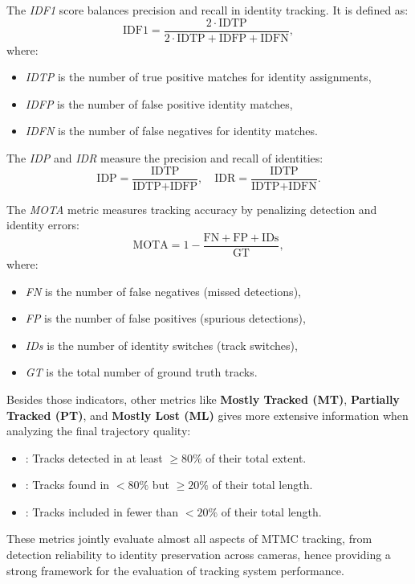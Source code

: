 The \textit{IDF1} score balances precision and recall in identity tracking. It is defined as:
\[
\text{IDF1} = \frac{2 \cdot \text{IDTP}}{2 \cdot \text{IDTP} + \text{IDFP} + \text{IDFN}},
\]
where:
\begin{itemize}
    \item \textit{IDTP} is the number of true positive matches for identity assignments,
    \item \textit{IDFP} is the number of false positive identity matches,
    \item \textit{IDFN} is the number of false negatives for identity matches.
\end{itemize}

The \textit{IDP} and \textit{IDR} measure the precision and recall of identities:
\[
\text{IDP} = \frac{\text{IDTP}}{\text{IDTP} + \text{IDFP}}, \quad
\text{IDR} = \frac{\text{IDTP}}{\text{IDTP} + \text{IDFN}}.
\]

The \textit{MOTA} metric measures tracking accuracy by penalizing detection and identity errors:
\[
\text{MOTA} = 1 - \frac{\text{FN} + \text{FP} + \text{IDs}}{\text{GT}},
\]
where:
\begin{itemize}
    \item \textit{FN} is the number of false negatives (missed detections),
    \item \textit{FP} is the number of false positives (spurious detections),
    \item \textit{IDs} is the number of identity switches (track switches),
    \item \textit{GT} is the total number of ground truth tracks.
\end{itemize}

Besides those indicators, other metrics like \textbf{Mostly Tracked (MT)}, \textbf{Partially Tracked (PT)}, and \textbf{Mostly Lost (ML)} gives more extensive information when analyzing the final trajectory quality:
\begin{itemize}
    \item {}: Tracks detected in at least $\geq 80\%$ of their total extent.
    \item {}: Tracks found in $< 80\%$ but $\geq 20\%$ of their total length.
    \item {}: Tracks included in fewer than $< 20\%$ of their total length.
\end{itemize}

These metrics jointly evaluate almost all aspects of MTMC tracking, from detection reliability to identity preservation across cameras, hence providing a strong framework for the evaluation of tracking system performance.

